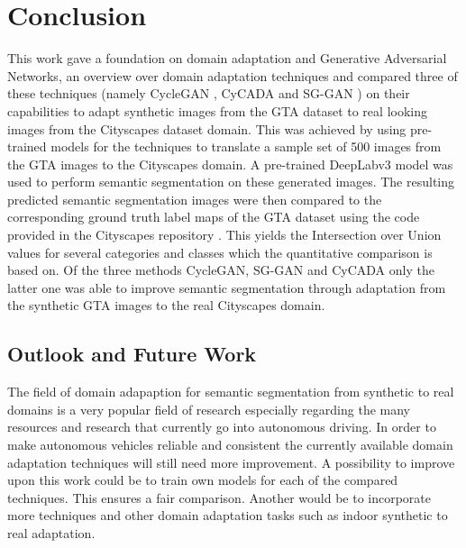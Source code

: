 \chapter{Conclusion}
\label{sec:conclusion}

This work gave a foundation on domain adaptation and Generative Adversarial Networks, an overview over domain adaptation techniques and compared three of these techniques (namely CycleGAN \cite{DBLP:journals/corr/ZhuPIE17}, CyCADA \cite{DBLP:journals/corr/abs-1711-03213} and SG-GAN \cite{DBLP:journals/corr/abs-1801-01726}) on their capabilities to adapt synthetic images from the GTA dataset \cite{Richter_2016_ECCV} to real looking images from the Cityscapes dataset \cite{Cordts_2016_CVPR} domain. This was achieved by using pre-trained models for the techniques to translate a sample set of 500 images from the GTA images to the Cityscapes domain. A pre-trained DeepLabv3 \cite{DBLP:journals/corr/ChenPSA17} model was used to perform semantic segmentation on these generated images. The resulting predicted semantic segmentation images were then compared to the corresponding ground truth label maps of the GTA dataset using the code provided in the Cityscapes repository \cite{CSR}. This yields the Intersection over Union values for several categories and classes which the quantitative comparison is based on.
Of the three methods CycleGAN, SG-GAN and CyCADA only the latter one was able to improve semantic segmentation through adaptation from the synthetic GTA images to the real Cityscapes domain. 

\section{Outlook and Future Work}

The field of domain adapaption for semantic segmentation from synthetic to real domains is a very popular field of research especially regarding the many resources and research that currently go into autonomous driving. In order to make autonomous vehicles reliable and consistent the currently available domain adaptation techniques will still need more improvement. A possibility to improve upon this work could be to train own models for each of the compared techniques. This ensures a fair comparison. Another would be to incorporate more techniques and other domain adaptation tasks such as indoor synthetic to real adaptation. 